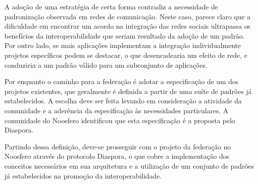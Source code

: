 A adoção de uma estratégia de certa forma contradiz a necessidade de padronização
observada em redes de comunicação. Neste caso, parece claro que a dificuldade em
encontrar um acordo na integração das redes sociais ultrapassa os benefícios da
interoperabilidade que seriam resultado da adoção de um padrão. Por outro lado, se
mais aplicações implementam a integração individualmente projetos específicos podem
se destacar, o que desencadearia um efeito de rede, e conduziria a um padrão válido
para um subconjunto de aplicações.

Por enquanto o caminho para a federação é adotar a especificação de um dos projetos
existentes, que geralmente é definida a partir de uma suíte de padrões já
estabelecidos. A escolha deve ser feita levando em consideração a atividade da
comunidade e a aderência da especificação às necessidades particulares. A comunidade
do Noosfero identificou que esta especificação é a proposta pelo Diaspora.

Partindo dessa definição, deve-se prosseguir com o projeto da federação no Noosfero
através do protocolo Diaspora, o que cobre a implementação dos conceitos necessários
em sua arquitetura e a utilização de um conjunto de padrões já estabelecidos na
promoção da interoperabilidade.
